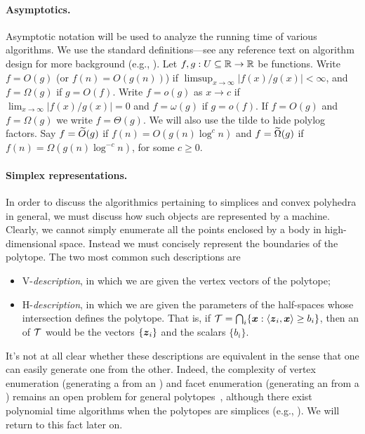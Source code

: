 \paragraph{Asymptotics.}
Asymptotic notation will be used to analyze the running time of various algorithms. We use the standard definitions---see any reference text on algorithm design for more background (e.g., \cite{kleinberg2006algorithm}). Let $f,g:U\subseteq \mathbb{R} \to \mathbb{R}$ be functions. Write $f=O(g)$ (or $f(n)=O(g(n))$) if $\limsup_{x\to \infty}|f(x)/g(x)|<\infty$, and $f=\Omega(g)$ if $g=O(f)$. Write $f=o(g)$ as $x\to c$ if $\lim_{x\to \infty}|f(x)/g(x)|=0$ and $f=\omega(g)$ if $g=o(f)$. If $f=O(g)$ and $f=\Omega(g)$ we write $f=\Theta(g)$. We will also use the tilde to hide polylog factors. Say $f=\widetilde{O}(g)$ if $f(n) = O(g(n) \log^c n)$ and $f=\widetilde{\Omega}(g)$ if $f(n) = \Omega(g(n) \log^{-c}n)$, for some $c\geq 0$. 


\paragraph{Simplex representations.}
In order to discuss the algorithmics pertaining to simplices and convex polyhedra in general, we must discuss how such objects are represented by a machine. Clearly, we cannot simply enumerate all the points enclosed by a body in high-dimensional space. Instead we must concisely represent the boundaries of the polytope. The two most common such descriptions are 
\begin{itemize}
	\item \textsf{V}-\emph{description}, in which we are given the vertex vectors of the polytope; 
	\item \textsf{H}-\emph{description}, in which we are given the parameters of the half-spaces whose intersection defines the polytope. That is, if $\mathcal{T}=\bigcap_i \{\vb*{x}:\langle \vb*{z}_i,\vb*{x}\rangle \geq b_i\}$, then an \hdesc of $\mathcal{T}$ would be the vectors $\{\vb*{z}_i\}$ and the scalars $\{b_i\}$. 
\end{itemize}

It's not at all clear whether these descriptions are equivalent in the sense that one can easily generate one from the other. Indeed, the complexity of vertex enumeration (generating a \vdesc from an \hdesc) and facet enumeration (generating an \hdesc from a \vdesc) remains an open problem for general polytopes~\cite{kaibel2003some}, although there exist polynomial time algorithms when the polytopes are simplices (e.g., \cite{bremner1998primal}). We will return to this fact later on. 

